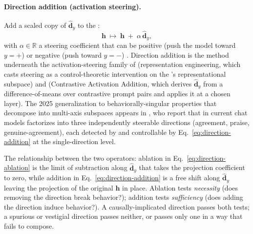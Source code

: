 \paragraph{Direction addition (activation steering).} Add a scaled
copy of $\hat{\mathbf{d}}_y$ to the :
\begin{equation}
  \boxed{\;
  \mathbf{h} \;\mapsto\;
  \mathbf{h} \;+\; \alpha\,\hat{\mathbf{d}}_y,
  \;}
  \label{eq:direction-addition}
\end{equation}
with $\alpha \in \mathbb{R}$ a steering coefficient that can be
positive (push the model toward $y = +$) or negative (push toward
$y = -$) \citep{marks-tegmark-2023-truth}. Direction addition is the
method underneath the activation-steering family of
(representation engineering, which casts steering as a control-theoretic
intervention on the 's representational subspace) and
 (Contrastive
Activation Addition, which derives $\hat{\mathbf{d}}_y$ from a
difference-of-means over contrastive prompt pairs and applies it at a
chosen layer). The 2025 generalization to behaviorally-singular
properties that decompose into multi-axis subspaces appears in
, who report that  in current chat models
factorizes into three independently steerable directions (agreement,
praise, genuine-agreement), each detected by  and %
controllable by Eq.~\eqref{eq:direction-addition} at the
single-direction level.

The relationship between the two operators: ablation in
Eq.~\eqref{eq:direction-ablation} is the limit of subtraction along
$\hat{\mathbf{d}}_y$ that takes the projection coefficient to zero,
while addition in Eq.~\eqref{eq:direction-addition} is a free shift
along $\hat{\mathbf{d}}_y$ leaving the projection of the original
$\mathbf{h}$ in place. Ablation tests \emph{necessity} (does removing
the direction break behavior?); addition tests \emph{sufficiency}
(does adding the direction induce behavior?). A causally-implicated
direction passes both tests; a spurious or vestigial direction passes
neither, or passes only one in a way that fails to compose.

